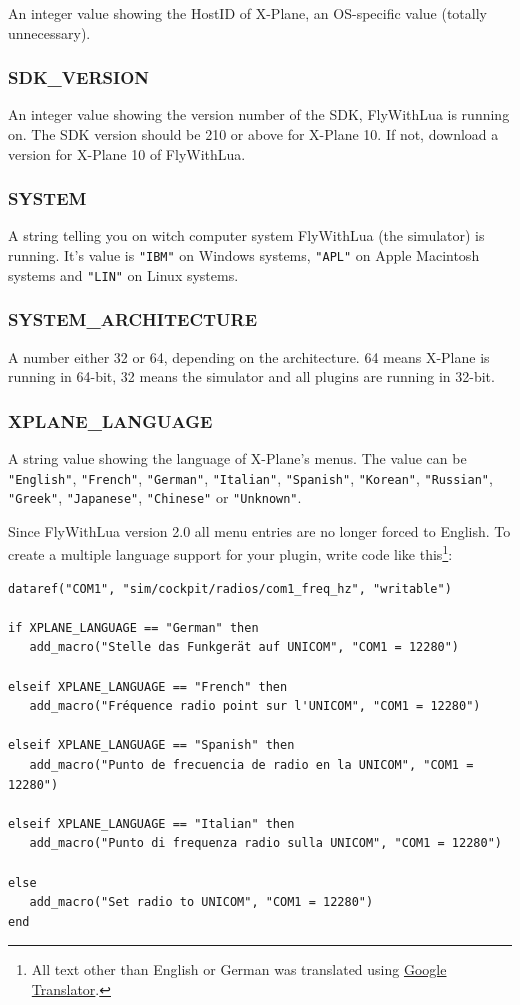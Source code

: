 \documentclass[11pt,parskip=half,a4paper]{scrartcl}
\begin{document}
An integer value showing the HostID of X-Plane, an OS-specific value (totally unnecessary).

\subsubsection{SDK\_VERSION}

An integer value showing the version number of the SDK, FlyWithLua is running on. The SDK version should be 210 or above for X-Plane 10. If not, download a version for X-Plane 10 of FlyWithLua.

\subsubsection{SYSTEM}

A string telling you on witch computer system FlyWithLua (the simulator) is running. It's value is \verb|"IBM"| on Windows systems, \verb|"APL"| on Apple Macintosh systems and \verb|"LIN"| on Linux systems.

\subsubsection{SYSTEM\_ARCHITECTURE}

A number either 32 or 64, depending on the architecture. 64 means X-Plane is running in 64-bit, 32 means the simulator and all plugins are running in 32-bit.

\subsubsection{XPLANE\_LANGUAGE}

A string value showing the language of X-Plane's menus. The value can be \verb|"English"|, \verb|"French"|, \verb|"German"|, \verb|"Italian"|, \verb|"Spanish"|, \verb|"Korean"|, \verb|"Russian"|, \verb|"Greek"|, \verb|"Japanese"|, \verb|"Chinese"| or \verb|"Unknown"|.

\newpage
Since FlyWithLua version 2.0 all menu entries are no longer forced to English. To create a multiple language support for your plugin, write code like this\footnote{All text other than English or German was translated using \href{http://translate.google.com/}{Google Translator}.}:

\begin{lstlisting}
dataref("COM1", "sim/cockpit/radios/com1_freq_hz", "writable")

if XPLANE_LANGUAGE == "German" then
   add_macro("Stelle das Funkgerät auf UNICOM", "COM1 = 12280")

elseif XPLANE_LANGUAGE == "French" then
   add_macro("Fréquence radio point sur l'UNICOM", "COM1 = 12280")

elseif XPLANE_LANGUAGE == "Spanish" then
   add_macro("Punto de frecuencia de radio en la UNICOM", "COM1 = 12280")

elseif XPLANE_LANGUAGE == "Italian" then
   add_macro("Punto di frequenza radio sulla UNICOM", "COM1 = 12280")

else
   add_macro("Set radio to UNICOM", "COM1 = 12280")
end
\end{lstlisting}
\end{document}
